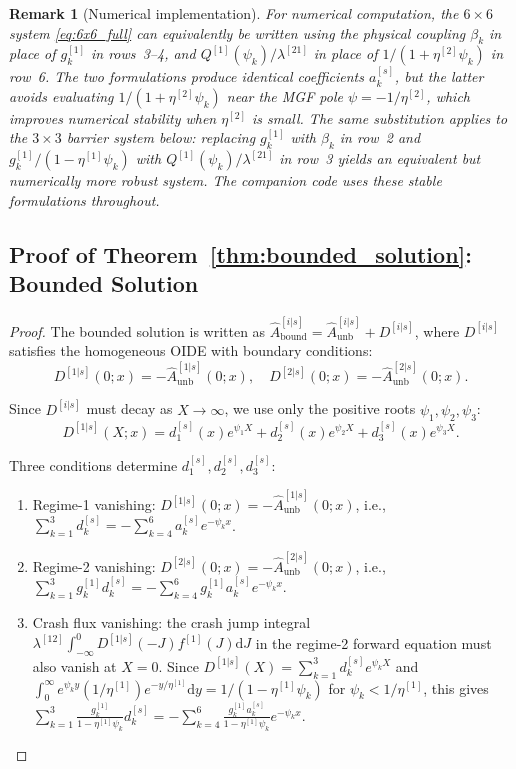 \documentclass[11pt,a4paper]{article}
\numberwithin{equation}{section}
\newtheorem{remark}[theorem]{Remark}
\newcommand{\dd}{\mathrm{d}}
\newcommand{\ie}{\textrm{i.e.,}}
\begin{document}
\begin{appendices}
\begin{remark}[Numerical implementation]
For numerical computation, the $6 \times 6$ system \eqref{eq:6x6_full} can equivalently be written using the physical coupling $\beta_k$ in place of $g^{[1]}_k$ in rows~3--4, and $Q^{[1]}(\psi_k)/\lambda^{[21]}$ in place of $1/(1+\eta^{[2]}\psi_k)$ in row~6.  The two formulations produce identical coefficients $a^{[s]}_k$, but the latter avoids evaluating $1/(1+\eta^{[2]}\psi_k)$ near the MGF pole $\psi = -1/\eta^{[2]}$, which improves numerical stability when $\eta^{[2]}$ is small.  The same substitution applies to the $3 \times 3$ barrier system below: replacing $g^{[1]}_k$ with $\beta_k$ in row~2 and $g^{[1]}_k/(1-\eta^{[1]}\psi_k)$ with $Q^{[1]}(\psi_k)/\lambda^{[21]}$ in row~3 yields an equivalent but numerically more robust system.  The companion code uses these stable formulations throughout.
\end{remark}

\subsection{Proof of Theorem~\ref{thm:bounded_solution}: Bounded Solution}\label{app:bounded_proof}

\begin{proof}
The bounded solution is written as $\hat{A}^{[i|s]}_{\mathrm{bound}} = \hat{A}^{[i|s]}_{\mathrm{unb}} + D^{[i|s]}$, where $D^{[i|s]}$ satisfies the homogeneous OIDE with boundary conditions:
\begin{equation}
D^{[1|s]}(0; x) = -\hat{A}^{[1|s]}_{\mathrm{unb}}(0; x), \quad D^{[2|s]}(0; x) = -\hat{A}^{[2|s]}_{\mathrm{unb}}(0; x).
\end{equation}

Since $D^{[i|s]}$ must decay as $X \to \infty$, we use only the positive roots $\psi_1, \psi_2, \psi_3$:
\begin{equation}
D^{[1|s]}(X; x) = d^{[s]}_1(x) e^{\psi_1 X} + d^{[s]}_2(x) e^{\psi_2 X} + d^{[s]}_3(x) e^{\psi_3 X}.
\end{equation}

Three conditions determine $d^{[s]}_1, d^{[s]}_2, d^{[s]}_3$:
\begin{enumerate}
\item Regime-1 vanishing: $D^{[1|s]}(0; x) = -\hat{A}^{[1|s]}_{\mathrm{unb}}(0; x)$, \ie\ $\sum_{k=1}^3 d^{[s]}_k = -\sum_{k=4}^6 a^{[s]}_k e^{-\psi_k x}$.
\item Regime-2 vanishing: $D^{[2|s]}(0; x) = -\hat{A}^{[2|s]}_{\mathrm{unb}}(0; x)$, \ie\ $\sum_{k=1}^3 g^{[1]}_k d^{[s]}_k = -\sum_{k=4}^6 g^{[1]}_k a^{[s]}_k e^{-\psi_k x}$.
\item Crash flux vanishing: the crash jump integral $\lambda^{[12]}\!\int_{-\infty}^{0}\! D^{[1|s]}(-J)f^{[1]}(J)\dd J$ in the regime-2 forward equation must also vanish at $X = 0$. Since $D^{[1|s]}(X) = \sum_{k=1}^3 d^{[s]}_k e^{\psi_k X}$ and $\int_0^\infty e^{\psi_k y}(1/\eta^{[1]})e^{-y/\eta^{[1]}}\dd y = 1/(1-\eta^{[1]}\psi_k)$ for $\psi_k < 1/\eta^{[1]}$, this gives $\sum_{k=1}^3 \frac{g^{[1]}_k}{1-\eta^{[1]}\psi_k} d^{[s]}_k = -\sum_{k=4}^6 \frac{g^{[1]}_k a^{[s]}_k}{1-\eta^{[1]}\psi_k} e^{-\psi_k x}$.
\end{enumerate}


\end{proof}
\end{appendices}
\end{document}
